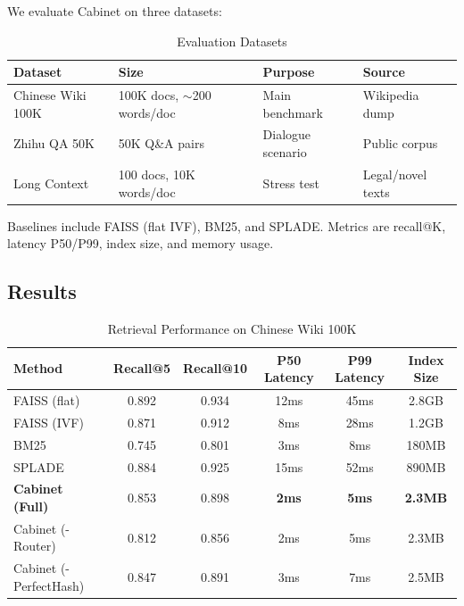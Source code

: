 \documentclass[11pt,a4paper]{article}
\theoremstyle{definition}
\begin{document}
We evaluate Cabinet on three datasets:

\begin{table}[H]
\centering
\caption{Evaluation Datasets}
\label{tab:datasets}
\begin{tabular}{llll}
\toprule
\textbf{Dataset} & \textbf{Size} & \textbf{Purpose} & \textbf{Source} \\
\midrule
Chinese Wiki 100K & 100K docs, $\sim$200 words/doc & Main benchmark & Wikipedia dump \\
Zhihu QA 50K & 50K Q\&A pairs & Dialogue scenario & Public corpus \\
Long Context & 100 docs, 10K words/doc & Stress test & Legal/novel texts \\
\bottomrule
\end{tabular}
\end{table}

Baselines include FAISS (flat IVF), BM25, and SPLADE. Metrics are recall@K, latency P50/P99, index size, and memory usage.

\subsection{Results}

\begin{table}[H]
\centering
\caption{Retrieval Performance on Chinese Wiki 100K}
\label{tab:results}
\begin{tabular}{lccccc}
\toprule
\textbf{Method} & \textbf{Recall@5} & \textbf{Recall@10} & \textbf{P50 Latency} & \textbf{P99 Latency} & \textbf{Index Size} \\
\midrule
FAISS (flat) & 0.892 & 0.934 & 12ms & 45ms & 2.8GB \\
FAISS (IVF) & 0.871 & 0.912 & 8ms & 28ms & 1.2GB \\
BM25 & 0.745 & 0.801 & 3ms & 8ms & 180MB \\
SPLADE & 0.884 & 0.925 & 15ms & 52ms & 890MB \\
\midrule
\textbf{Cabinet (Full)} & 0.853 & 0.898 & \textbf{2ms} & \textbf{5ms} & \textbf{2.3MB} \\
Cabinet (-Router) & 0.812 & 0.856 & 2ms & 5ms & 2.3MB \\
Cabinet (-PerfectHash) & 0.847 & 0.891 & 3ms & 7ms & 2.5MB \\
\bottomrule
\end{tabular}
\end{table}
\end{document}

